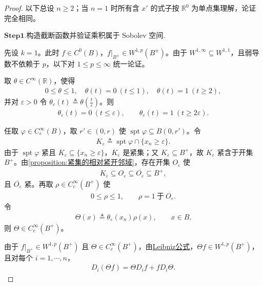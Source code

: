 \documentclass[../../main.tex]{subfiles}
\begin{document}
\begin{proof}

以下总设 $n\geqslant2$；当 $n=1$ 时所有含 $x'$ 的式子按 $\mathbb{R}^{0}$ 为单点集理解，论证完全相同。
    
\noindent$\mathbf{Step}\bm{1}$.{\heiti 构造截断函数并验证乘积属于 Sobolev 空间.}

先设 $k=1$。此时 $f\in C^{0}(B)$，$f|_{B^{\pm}}\in W^{1,p}(B^{\pm})$。由于 $W^{1,\infty}\subseteq W^{1,1}$，且弱导数不依赖于 $p$，以下对 $1\leqslant p\leqslant\infty$ 统一论证。

取 $\theta\in C^{\infty}(\mathbb{R})$，使得
\begin{align*}
0\leqslant\theta\leqslant1,\quad
\theta(t)=0\ (t\leqslant1),\quad
\theta(t)=1\ (t\geqslant2),
\end{align*}
并对 $\varepsilon>0$ 令 $\theta_{\varepsilon}(t)\triangleq\theta\left(\frac{t}{\varepsilon}\right)$。则
\begin{align}
\theta_{\varepsilon}(t)=0\ (t\leqslant\varepsilon),\qquad
\theta_{\varepsilon}(t)=1\ (t\geqslant2\varepsilon).
\label{eq:ch05-theta性质}
\end{align}

任取 $\varphi\in C_{c}^{\infty}(B)$，取 $r'\in(0,r)$ 使 $\operatorname{spt}\varphi\subseteq B(0,r')$。令
\begin{align*}
K_{\varepsilon}\triangleq\operatorname{spt}\varphi\cap\{x_n\geqslant\varepsilon\}.
\end{align*}
由于 $\operatorname{spt}\varphi$ 紧且 $K_{\varepsilon}\subseteq\{x_n\geqslant\varepsilon\}$，$K_{\varepsilon}$ 是紧集；又 $K_{\varepsilon}\subseteq B^{+}$，故 $K_{\varepsilon}$ 紧含于开集 $B^{+}$。由\cref{proposition:紧集的相对紧开邻域}，存在开集 $O_{\varepsilon}$ 使
\begin{align*}
K_{\varepsilon}\subseteq O_{\varepsilon}\subseteq\overline{O_{\varepsilon}}\subseteq B^{+},
\end{align*}
且 $\overline{O_{\varepsilon}}$ 紧。再取 $\rho\in C_{c}^{\infty}(B^{+})$ 使
\begin{align}
0\leqslant\rho\leqslant1,\qquad \rho=1\ \text{于}\ \overline{O_{\varepsilon}}.
\label{eq:ch05-rho性质}
\end{align}
令
\begin{align}
\Theta(x)\triangleq\theta_{\varepsilon}(x_n)\rho(x),\qquad x\in B.
\label{eq:ch05-Theta定义}
\end{align}
则 $\Theta\in C_{c}^{\infty}(B^{+})$。

由于 $f|_{B^{+}}\in W^{1,p}(B^{+})$ 且 $\Theta\in C_{c}^{\infty}(B^{+})$，由\hyperref[theorem:ch05-弱导数性质-4]{Leibniz公式}，$\Theta f\in W^{1,p}(B^{+})$，且对每个 $i=1,\cdots,n$，
\begin{align}
D_i(\Theta f)=\Theta D_if+fD_i\Theta.
\label{eq:ch05-片状乘积导数}
\end{align}


\end{proof}
\end{document}
